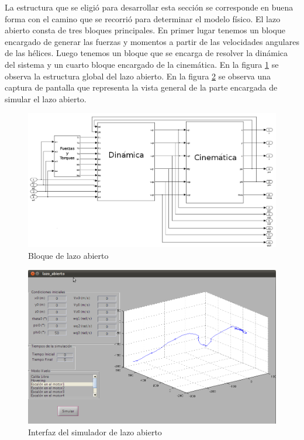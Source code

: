 \documentclass[main]{subfiles}
\begin{document}
La estructura que se eligi\'o para desarrollar esta secci\'on se corresponde en buena forma con el camino que se recorri\'o para determinar el modelo f\'isico. El lazo abierto consta de tres bloques principales. En primer lugar tenemos un bloque encargado de generar las fuerzas y momentos a partir de las velocidades angulares de las h\'elices. Luego tenemos un bloque que se encarga de resolver la din\'amica del sistema y un cuarto bloque encargado de la cinem\'atica. En la figura \ref{fig:lazo_abierto} se observa la estructura global del lazo abierto. En la figura \ref{fig:vista} se observa una captura de pantalla que representa la vista general de la parte encargada de simular el lazo abierto.
\begin{figure}[h!]
	\centering
	\includegraphics[width=1\textwidth]{./pics_simulador/lazo_abierto.pdf}
	\caption{Bloque de lazo abierto}
	\label{fig:lazo_abierto}
\end{figure}

\begin{figure}[h!]
	\centering
	\includegraphics[width=1\textwidth]{./pics_simulador/vista.png}
	\caption{Interfaz del simulador de lazo abierto}
	\label{fig:vista}
\end{figure}
\end{document}
